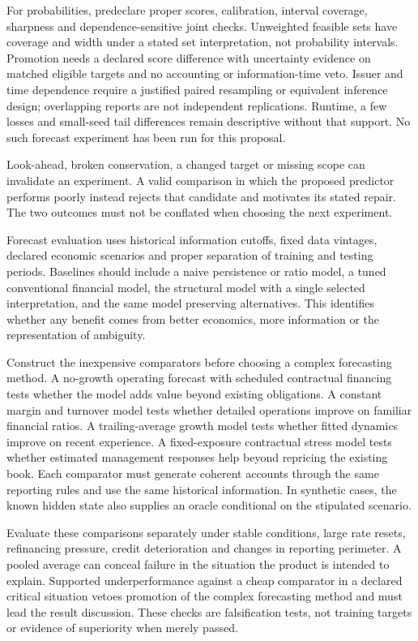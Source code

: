For probabilities, predeclare proper scores, calibration, interval coverage,
sharpness and dependence-sensitive joint checks. Unweighted feasible sets have
coverage and width under a stated set interpretation, not probability intervals.
Promotion needs a declared score difference with uncertainty evidence on matched
eligible targets and no accounting or information-time veto. Issuer and time
dependence require a justified paired resampling or equivalent inference design;
overlapping reports are not independent replications. Runtime, a few losses and
small-seed tail differences remain descriptive without that support. No such
forecast experiment has been run for this proposal.

Look-ahead, broken conservation, a changed target or missing scope can invalidate
an experiment. A valid comparison in which the proposed predictor performs
poorly instead rejects that candidate and motivates its stated repair. The two
outcomes must not be conflated when choosing the next experiment.

Forecast evaluation uses historical information cutoffs, fixed data vintages,
declared economic scenarios and proper separation of training and testing
periods. Baselines should include a naive persistence or ratio model, a tuned
conventional financial model, the structural model with a single selected
interpretation, and the same model preserving alternatives. This identifies
whether any benefit comes from better economics, more information or the
representation of ambiguity.

Construct the inexpensive comparators before choosing a complex forecasting
method. A no-growth operating forecast with scheduled contractual financing
tests whether the model adds value beyond existing obligations. A constant
margin and turnover model tests whether detailed operations improve on familiar
financial ratios. A trailing-average growth model tests whether fitted dynamics
improve on recent experience. A fixed-exposure contractual stress model tests
whether estimated management responses help beyond repricing the existing
book. Each comparator must generate coherent accounts through the same reporting
rules and use the same historical information. In synthetic cases, the known
hidden state also supplies an oracle conditional on the stipulated scenario.

Evaluate these comparisons separately under stable conditions, large rate
resets, refinancing pressure, credit deterioration and changes in reporting
perimeter. A pooled average can conceal failure in the situation the product
is intended to explain. Supported underperformance against a cheap comparator
in a declared critical situation vetoes promotion of the complex forecasting
method and must lead the result discussion. These checks are falsification
tests, not training targets or evidence of superiority when merely passed.

